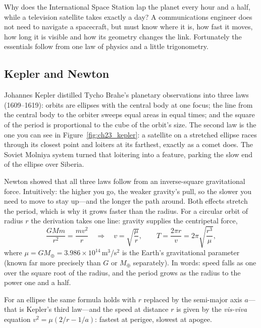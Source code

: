 Why does the International Space Station lap the planet every hour and a half, while a television
satellite takes exactly a day? A communications engineer does not need to navigate a spacecraft,
but must know where it is, how fast it moves, how long it is visible and how its geometry changes
the link. Fortunately the essentials follow from one law of physics and a little trigonometry.

\subsection{Kepler and Newton}


Johannes Kepler distilled Tycho Brahe's planetary observations into three laws (1609--1619):
orbits are ellipses with the central body at one focus; the line from the central body to the
orbiter sweeps equal areas in equal times; and the square of the period is proportional to the
cube of the orbit's size. The second law is the one you can see in
Figure~\ref{fig:ch23_kepler}: a satellite on a stretched ellipse races through its closest point
and loiters at its farthest, exactly as a comet does. The Soviet Molniya system turned that
loitering into a feature, parking the slow end of the ellipse over Siberia.

Newton showed that all three laws follow from an inverse-square gravitational force. Intuitively:
the higher you go, the weaker gravity's pull, so the slower you need to move to stay up---and the
longer the path around. Both effects stretch the period, which is why it grows faster than the
radius. For a circular orbit of radius $r$ the derivation takes one line: gravity supplies the
centripetal force,
\begin{equation}
\frac{GMm}{r^2}=\frac{mv^2}{r}\quad\Longrightarrow\quad
v=\sqrt{\frac{\mu}{r}},\qquad
T=\frac{2\pi r}{v}=2\pi\sqrt{\frac{r^3}{\mu}},
\label{eq:ch23:period}
\end{equation}
where $\mu=GM_\oplus=3.986\times10^{14}$\,m$^3$/s$^2$ is the Earth's gravitational parameter
(known far more precisely than $G$ or $M_\oplus$ separately). In words: speed falls as one over the
square root of the radius, and the period grows as the radius to the power one and a half.

For an ellipse the same formula holds with $r$ replaced by the semi-major axis $a$---that is
Kepler's third law---and the speed at distance $r$ is given by the \emph{vis-viva} equation
$v^2=\mu(2/r-1/a)$: fastest at perigee, slowest at apogee.

